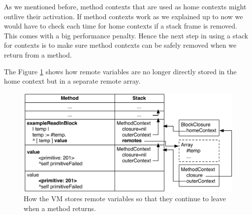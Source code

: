 \documentclass[a4paper,10pt,twoside]{book}
\begin{document}
As we mentioned before, method contexts that are used as home contexts might outlive their activation.
If method contexts work as we explained up to now we would have to check each time for home contexts if a stack frame is removed.
This comes with a big performance penalty.
Hence the next step in using a stack for contexts is to make sure method contexts can be safely removed when we return from a method.

The Figure \ref{fig:BlockWithMethodContext} shows how remote variables
are no longer directly stored in the home context but in a separate
remote array.

\begin{figure}
  \begin{center}
    \includegraphics[width=\textwidth]{BlockWithMethodContext}
    \caption{How the VM stores remote variables so that they continue to leave when a method returns.\label{fig:BlockWithMethodContext}}
  \end{center}
\end{figure}




\end{document}
